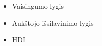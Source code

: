 \begin{itemize}
    \item Vaisingumo lygis -
    \item Aukštojo išsilavinimo lygis -
    \item HDI
\end{itemize}